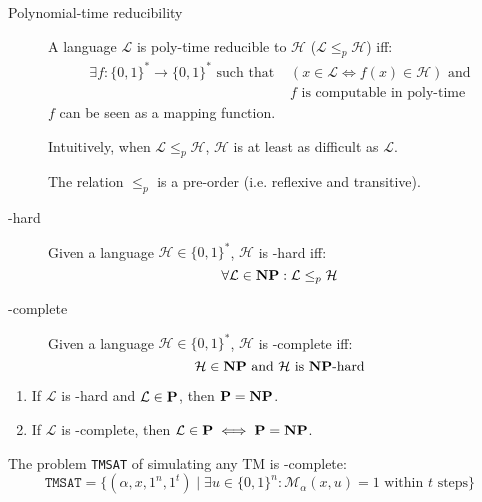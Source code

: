 \begin{description}
    \item[Polynomial-time reducibility] 
        A language $\mathcal{L}$ is poly-time reducible to $\mathcal{H}$ ($\mathcal{L} \leq_p \mathcal{H}$) iff:
        \[ 
            \begin{split}
                \exists f: \{0, 1\}^* \rightarrow \{0, 1\}^* \text{ such that } &(x \in \mathcal{L} \iff f(x) \in \mathcal{H}) \text{ and} \\
                &\text{$f$ is computable in poly-time}
            \end{split}
        \]
        $f$ can be seen as a mapping function.

        \begin{remark}
            Intuitively, when $\mathcal{L} \leq_p \mathcal{H}$, $\mathcal{H}$ is at least as difficult as $\mathcal{L}$.
        \end{remark}

        \begin{theorem}
            The relation $\leq_p$ is a pre-order (i.e. reflexive and transitive).
        \end{theorem}

    \item[\NP-hard] 
        Given a language $\mathcal{H} \in \{0, 1\}^*$, $\mathcal{H}$ is \NP-hard iff:
        \[ \forall \mathcal{L} \in \NP: \mathcal{L} \leq_p \mathcal{H} \]
    
    \item[\NP-complete] 
        Given a language $\mathcal{H} \in \{0, 1\}^*$, $\mathcal{H}$ is \NP-complete iff:
        \[ \mathcal{H} \in \NP \text{ and } \mathcal{H} \text{ is \NP-hard} \]
\end{description}

\begin{theorem}
    \phantom{}
    \begin{enumerate}
        \item If $\mathcal{L}$ is \NP-hard and $\mathcal{L} \in \P$, then $\P = \NP$.
        \item If $\mathcal{L}$ is \NP-complete, then $\mathcal{L} \in \P \iff \P = \NP$.
    \end{enumerate}
\end{theorem}

\begin{theorem}
    The problem \texttt{TMSAT} of simulating any TM is \NP-complete:
    \[ \texttt{TMSAT} = \{ (\alpha, x, 1^n, 1^t) \mid \exists u \in \{0, 1\}^n: \mathcal{M}_\alpha(x, u) = 1 \text{ within $t$ steps} \} \]
\end{theorem}

